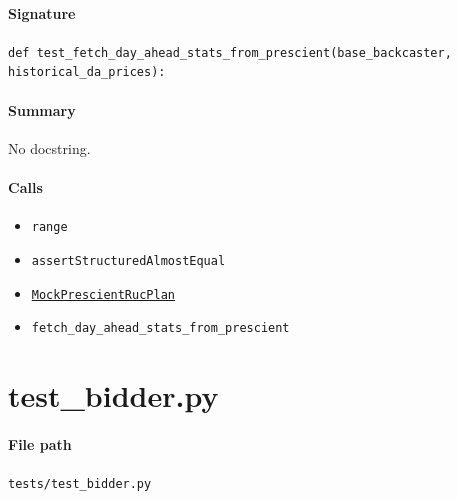 \documentclass[11pt]{report}
\begin{document}
\paragraph{Signature} \texttt{def test\_fetch\_day\_ahead\_stats\_from\_prescient(base\_backcaster, historical\_da\_prices):}
\paragraph{Summary} No docstring.
\paragraph{Calls}
\begin{itemize}[leftmargin=*]
  \item \texttt{range}
  \item \texttt{assertStructuredAlmostEqual}
  \item \hyperref[def:tests-test_backcaster.py:MockPrescientRucPlan:L304]{\texttt{MockPrescientRucPlan}}
  \item \texttt{fetch\_day\_ahead\_stats\_from\_prescient}
\end{itemize}

\section{test\_bidder.py}
\label{file:tests-test_bidder.py}
\paragraph{File path} \texttt{tests/test\_bidder.py}
\end{document}
